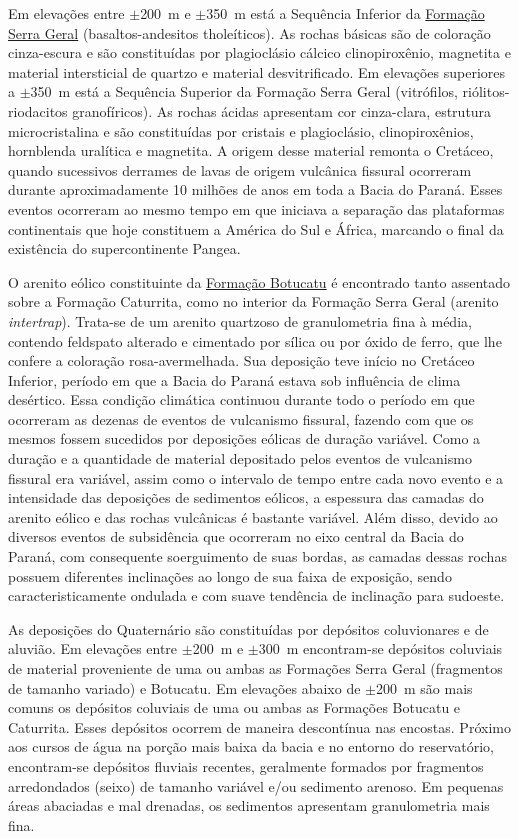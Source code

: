 Em elevações entre $\pm$200~m e $\pm$350~m está a Sequência Inferior da \href{http://pt.wikipedia.org/wiki/Forma\%C3\%A7\%C3\%A3o_Serra_Geral}{Formação Serra Geral} (basaltos-andesitos tholeíticos). As rochas básicas são de coloração cinza-escura e são constituídas por plagioclásio cálcico clinopiroxênio, magnetita e material intersticial de quartzo e material desvitrificado. Em elevações superiores a $\pm$350~m está a Sequência Superior da Formação Serra Geral (vitrófilos, riólitos-riodacitos granofíricos). As rochas ácidas apresentam cor cinza-clara, estrutura microcristalina e são constituídas por cristais e plagioclásio, clinopiroxênios, hornblenda uralítica e magnetita. A origem desse material remonta o Cretáceo, quando sucessivos derrames de lavas de origem vulcânica fissural ocorreram durante aproximadamente 10 milhões de anos em toda a Bacia do Paraná. Esses eventos ocorreram ao mesmo tempo em que iniciava a separação das plataformas continentais que hoje constituem a América do Sul e África, marcando o final da existência do supercontinente Pangea.

O arenito eólico constituinte da \href{http://pt.wikipedia.org/wiki/Forma\%C3\%A7\%C3\%A3o_Botucatu}{Formação Botucatu} é encontrado tanto assentado sobre a Formação Caturrita, como no interior da Formação Serra Geral (arenito \textit{intertrap}). Trata-se de um arenito quartzoso de granulometria fina à média, contendo feldspato alterado e cimentado por sílica ou por óxido de ferro, que lhe confere a coloração rosa-avermelhada. Sua deposição teve início no Cretáceo Inferior, período em que a Bacia do Paraná estava sob influência de clima desértico. Essa condição climática continuou durante todo o período em que ocorreram as dezenas de eventos de vulcanismo fissural, fazendo com que os mesmos fossem sucedidos por deposições eólicas de duração variável. Como a duração e a quantidade de material depositado pelos eventos de vulcanismo fissural era variável, assim como o intervalo de tempo entre cada novo evento e a intensidade das deposições de sedimentos eólicos, a espessura das camadas do arenito eólico e das rochas vulcânicas é bastante variável. Além disso, devido ao diversos eventos de subsidência que ocorreram no eixo central da Bacia do Paraná, com consequente soerguimento de suas bordas, as camadas dessas rochas possuem diferentes inclinações ao longo de sua faixa de exposição, sendo caracteristicamente ondulada e com suave tendência de inclinação para sudoeste.

As deposições do Quaternário são constituídas por depósitos coluvionares e de aluvião. Em elevações entre $\pm$200~m e $\pm$300~m encontram-se depósitos coluviais de material proveniente de uma ou ambas as Formações Serra Geral (fragmentos de tamanho variado) e Botucatu. Em elevações abaixo de $\pm$200~m são mais comuns os depósitos coluviais de uma ou ambas as Formações Botucatu e Caturrita. Esses depósitos ocorrem de maneira descontínua nas encostas. Próximo aos cursos de água na porção mais baixa da bacia e no entorno do reservatório, encontram-se depósitos fluviais recentes, geralmente formados por fragmentos arredondados (seixo) de tamanho variável e/ou sedimento arenoso. Em pequenas áreas abaciadas e mal drenadas, os sedimentos apresentam granulometria mais fina.

